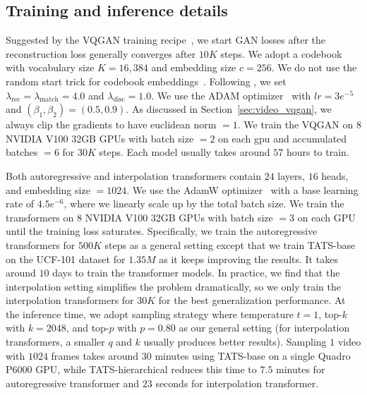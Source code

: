 \subsection{Training and inference details}
Suggested by the VQGAN training recipe~\cite{esser2021taming}, we start GAN losses after the reconstruction loss generally converges after $10K$ steps. 
We adopt a codebook with vocabulary size  $K=16,384$ and embedding size $c=256$. 
We do not use the random start trick for codebook embeddings~\cite{dhariwal2020jukebox,yan2021videogpt}. 
Following \cite{wang2018video}, we set $\lambda_\text{rec}=\lambda_\text{match}=4.0$ and $\lambda_\text{disc}=1.0$. 
We use the ADAM optimizer~\cite{kingma2014adam} with $lr = 3e^{-5}$ and $(\beta_1, \beta_2) = (0.5, 0.9)$. 
As discussed in Section~\ref{sec:video_vqgan}, we always clip the gradients to have euclidean norm $=1$. 
We train the VQGAN on $8$ NVIDIA V100 32GB GPUs with batch size $=2$ on each gpu and accumulated batches $=6$ for $30K$ steps. 
Each model usually takes around $57$ hours to train.

Both autoregressive and interpolation transformers contain $24$ layers, $16$ heads, and embedding size $=1024$. 
We use the AdamW optimizer~\cite{loshchilov2018decoupled} with a base learning rate of $4.5e^{-6}$, where we linearly scale up by the total batch size. 
We train the transformers on $8$ NVIDIA V100 32GB GPUs with batch size $=3$ on each GPU until the training loss saturates. 
Specifically, we train the autoregressive transformers for $500K$ steps as a general setting except that we train TATS-base on the UCF-101 dataset for $1.35M$ as it keeps improving the results. It takes around $10$ days to train the transformer models.
In practice, we find that the interpolation setting simplifies the problem dramatically, so we only train the interpolation transformers for $30K$ for the best generalization performance. 
At the inference time, we adopt sampling strategy where temperature $t=1$, top-$k$ with $k=2048$, and top-$p$ with $p=0.80$ as our general setting (for interpolation transformers, a smaller $q$ and $k$ usually produces better results). Sampling $1$ video with $1024$ frames takes around $30$ minutes using TATS-base on a single Quadro P6000 GPU, while TATS-hierarchical reduces this time to $7.5$ minutes for autoregressive transformer and $23$ seconds for interpolation transformer.

